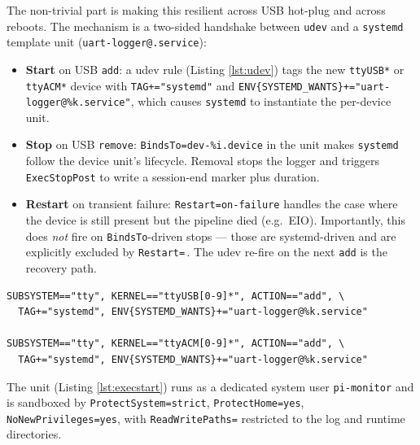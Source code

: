 \documentclass[11pt,a4paper]{article}
\begin{document}
The non-trivial part is making this resilient across USB hot-plug and
across reboots. The mechanism is a two-sided handshake between
\texttt{udev} and a \texttt{systemd} template unit
(\texttt{uart-logger@.service}):

\begin{itemize}
  \item \textbf{Start} on USB \texttt{add}: a udev rule
    (Listing \ref{lst:udev}) tags the new \texttt{ttyUSB*} or
    \texttt{ttyACM*} device with \texttt{TAG+="systemd"} and
    \texttt{ENV\{SYSTEMD\_WANTS\}+="uart-logger@\%k.service"},
    which causes \texttt{systemd} to instantiate the per-device unit.
  \item \textbf{Stop} on USB \texttt{remove}: \texttt{BindsTo=dev-\%i.device}
    in the unit makes \texttt{systemd} follow the device unit's
    lifecycle. Removal stops the logger and triggers
    \texttt{ExecStopPost} to write a session-end marker plus
    duration.
  \item \textbf{Restart} on transient failure: \texttt{Restart=on-failure}
    handles the case where the device is still present but the
    pipeline died (e.g.\ EIO). Importantly, this does \emph{not} fire
    on \texttt{BindsTo}-driven stops --- those are systemd-driven and
    are explicitly excluded by \texttt{Restart=}\,\cite{systemd-service}.
    The udev re-fire on the next \texttt{add} is the recovery path.
\end{itemize}

\begin{lstlisting}[language=udevrules,caption={\texttt{udev} rule
that bridges USB hot-plug into systemd. Both \texttt{ttyUSB*} (FTDI,
CP210x) and \texttt{ttyACM*} (CDC-ACM) are matched.},label={lst:udev}]
SUBSYSTEM=="tty", KERNEL=="ttyUSB[0-9]*", ACTION=="add", \
  TAG+="systemd", ENV{SYSTEMD_WANTS}+="uart-logger@%k.service"

SUBSYSTEM=="tty", KERNEL=="ttyACM[0-9]*", ACTION=="add", \
  TAG+="systemd", ENV{SYSTEMD_WANTS}+="uart-logger@%k.service"
\end{lstlisting}

The unit (Listing \ref{lst:execstart}) runs as a dedicated system user
\texttt{pi-monitor} and is sandboxed by \texttt{ProtectSystem=strict},
\texttt{ProtectHome=yes}, \texttt{NoNewPrivileges=yes}, with
\texttt{ReadWritePaths=} restricted to the log and runtime directories.
\end{document}
